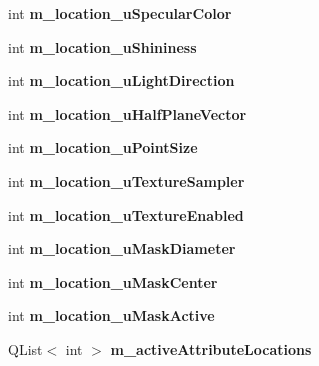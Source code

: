 \begin{DoxyCompactItemize}
int {\bfseries m\+\_\+location\+\_\+u\+Specular\+Color}
\item 
\mbox{\label{class_g_l_e_s_renderer_af1152640d14a616c9930161402da5eb3}} 
int {\bfseries m\+\_\+location\+\_\+u\+Shininess}
\item 
\mbox{\label{class_g_l_e_s_renderer_aba8a7f233b51b258542adce7114a93da}} 
int {\bfseries m\+\_\+location\+\_\+u\+Light\+Direction}
\item 
\mbox{\label{class_g_l_e_s_renderer_a8a4088b65277a3efa4810454c00e6a16}} 
int {\bfseries m\+\_\+location\+\_\+u\+Half\+Plane\+Vector}
\item 
\mbox{\label{class_g_l_e_s_renderer_a3cab0140a32534203dc8070058647d02}} 
int {\bfseries m\+\_\+location\+\_\+u\+Point\+Size}
\item 
\mbox{\label{class_g_l_e_s_renderer_ac2f2a0039e1b58fbd7d5abd3c43640bc}} 
int {\bfseries m\+\_\+location\+\_\+u\+Texture\+Sampler}
\item 
\mbox{\label{class_g_l_e_s_renderer_a82f6728d7361a42c33f0e88be7a329a2}} 
int {\bfseries m\+\_\+location\+\_\+u\+Texture\+Enabled}
\item 
\mbox{\label{class_g_l_e_s_renderer_a60785985120438561f095a5d0bb0a0e6}} 
int {\bfseries m\+\_\+location\+\_\+u\+Mask\+Diameter}
\item 
\mbox{\label{class_g_l_e_s_renderer_aa5865237289b4b166ccdcee4fafeefa7}} 
int {\bfseries m\+\_\+location\+\_\+u\+Mask\+Center}
\item 
\mbox{\label{class_g_l_e_s_renderer_ac7d1efb2e83cebe39608a9816856da64}} 
int {\bfseries m\+\_\+location\+\_\+u\+Mask\+Active}
\item 
\mbox{\label{class_g_l_e_s_renderer_a923229687ee02d0364a7e472fa1ed578}} 
Q\+List$<$ int $>$ {\bfseries m\+\_\+active\+Attribute\+Locations}
\item 
\mbox{\label{class_g_l_e_s_renderer_a437c4d81da1b944458b4abde903c23ce}} 

\end{DoxyCompactItemize}
